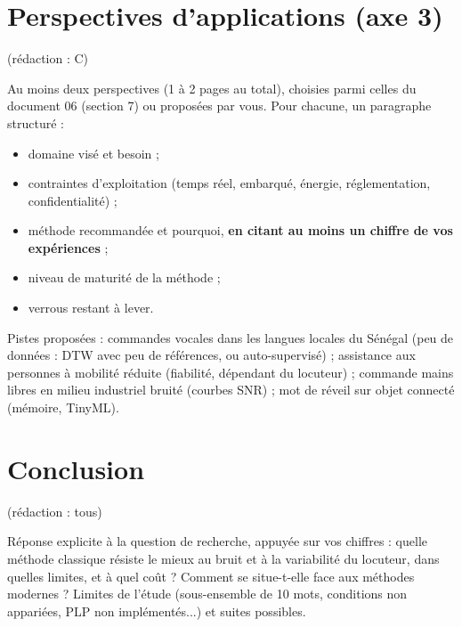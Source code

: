 \documentclass[11pt,a4paper]{article}
\newcommand{\redaction}[1]{\hfill{\small\color{gray}(rédaction : #1)}}   %
\begin{document}
\section{Perspectives d'applications (axe 3)}\label{sec:perspectives}\redaction{C}

\begin{aremplir}
Au moins deux perspectives (1 à 2 pages au total), choisies parmi celles du document 06 (section 7) ou proposées par vous. Pour chacune, un paragraphe structuré :
\begin{itemize}[leftmargin=*,itemsep=0pt]
\item domaine visé et besoin ;
\item contraintes d'exploitation (temps réel, embarqué, énergie, réglementation, confidentialité) ;
\item méthode recommandée et pourquoi, \textbf{en citant au moins un chiffre de vos expériences} ;
\item niveau de maturité de la méthode ;
\item verrous restant à lever.
\end{itemize}
Pistes proposées : commandes vocales dans les langues locales du Sénégal (peu de données : DTW avec peu de références, ou auto-supervisé) ; assistance aux personnes à mobilité réduite (fiabilité, dépendant du locuteur) ; commande mains libres en milieu industriel bruité (courbes SNR) ; mot de réveil sur objet connecté (mémoire, TinyML).
\end{aremplir}

\section{Conclusion}\redaction{tous}

\begin{aremplir}
Réponse explicite à la question de recherche, appuyée sur vos chiffres : quelle méthode classique résiste le mieux au bruit et à la variabilité du locuteur, dans quelles limites, et à quel coût ? Comment se situe-t-elle face aux méthodes modernes ? Limites de l'étude (sous-ensemble de 10 mots, conditions non appariées, PLP non implémentés...) et suites possibles.
\end{aremplir}
\end{document}
